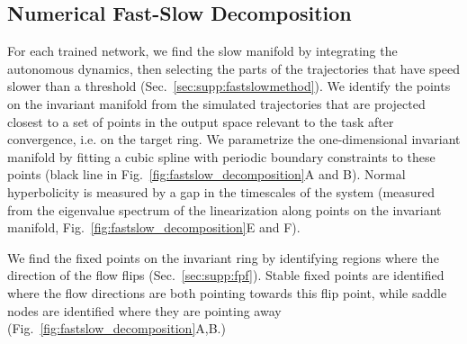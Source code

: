\documentclass{article} %
\newcounter{ct}
\theoremstyle{definition}
\theoremstyle{remark}
\begin{document}
\subsection{Numerical Fast-Slow Decomposition}\label{sec:fastslowmethod}
For each trained network, we find the slow manifold by integrating the autonomous dynamics, then selecting the parts of the trajectories that have speed slower than a threshold (Sec.~\ref{sec:supp:fastslowmethod}).
We identify the points on the invariant manifold from the simulated trajectories that are projected closest to a set of points in the output space relevant to the task after convergence, i.e. on the target ring.
We parametrize the one-dimensional invariant manifold by fitting a cubic spline with periodic boundary constraints to these points (black line in Fig.~\ref{fig:fastslow_decomposition}A and B).
Normal hyperbolicity is measured by a gap in the timescales of the system (measured from the eigenvalue spectrum of the linearization along points on the invariant manifold, Fig.~\ref{fig:fastslow_decomposition}E and F).


We find the fixed points on the invariant ring by identifying regions where the direction of the flow flips (Sec.~\ref{sec:supp:fpf}).
Stable fixed points are identified where the flow directions are both pointing towards this flip point,
while saddle nodes are identified where they are pointing away (Fig.~\ref{fig:fastslow_decomposition}A,B.) %
\end{document}
